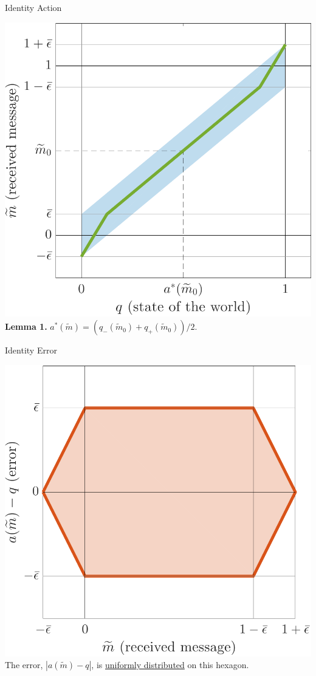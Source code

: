\documentclass[hyperref={colorlinks=true,linkcolor=blue,citecolor=blue}]{beamer}
\begin{document}
\begin{frame}{Identity Action}
\begin{center}
\includegraphics[scale=.45]{IdentityActionPlot}\\
\textbf{Lemma 1.} $a^{*}(\widetilde{m})=(q_{-}(\widetilde{m}_{0})+q_{+}(\widetilde{m}_{0}))/2$. 
\end{center}
\end{frame}

\begin{frame}{Identity Error}
\begin{center}
\includegraphics[scale=.45]{continuouserror}\\
The error, $|a(\widetilde{m})-q|$, is \underline{uniformly distributed} on this hexagon.
\end{center}
\end{frame}
\end{document}
